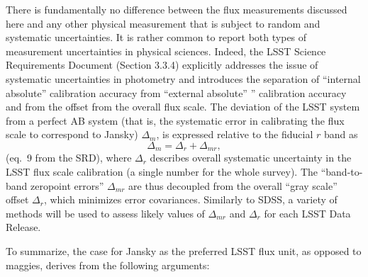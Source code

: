 \documentclass{emulateapj}
\begin{document}
There is fundamentally no difference between the flux measurements discussed
here and any other physical measurement that is subject to random and systematic
uncertainties. It is rather common to report both types of measurement uncertainties
in physical sciences. Indeed, the LSST  Science Requirements Document (Section 3.3.4)
explicitly addresses the issue of systematic uncertainties in photometry and
introduces the separation of ``internal absolute'' calibration accuracy 
from ``external absolute'' ” calibration accuracy and from the offset from the
overall flux scale. The deviation of the LSST system from a perfect AB system
(that is, the systematic error in calibrating the flux scale to correspond to Jansky)  
$\Delta_m$, is expressed relative to the fiducial $r$ band as 
\begin{equation}
             \Delta_m = \Delta_r + \Delta_{mr}, 
\end{equation}
(eq.~9 from the SRD), where $\Delta_r$ describes overall systematic uncertainty 
in the LSST flux scale calibration (a single number for the whole survey). The 
``band-to-band zeropoint errors'' $\Delta_{mr}$ are thus decoupled from the overall 
``gray scale'' offset $\Delta_{r}$, which minimizes error covariances. Similarly to SDSS, 
a variety of methods will be used to assess likely values of $\Delta_{mr}$ and 
$\Delta_r$ for each LSST Data Release. 

To summarize, the case for Jansky as the preferred LSST flux unit, as opposed
to maggies, derives from the following arguments: 
\end{document}
